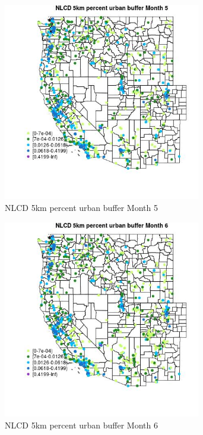 \begin{figure} 
\centering  
\includegraphics[width=0.77\textwidth]{Code_Outputs/Report_ML_input_PM25_Step4_part_e_de_duplicated_aves_compiled_2019-05-21wNAs_MapObsMo5NLCD_5km_percent_urban_buffer.jpg} 
\caption{\label{fig:Report_ML_input_PM25_Step4_part_e_de_duplicated_aves_compiled_2019-05-21wNAsMapObsMo5NLCD_5km_percent_urban_buffer}NLCD 5km percent urban buffer Month 5} 
\end{figure} 
 

\begin{figure} 
\centering  
\includegraphics[width=0.77\textwidth]{Code_Outputs/Report_ML_input_PM25_Step4_part_e_de_duplicated_aves_compiled_2019-05-21wNAs_MapObsMo6NLCD_5km_percent_urban_buffer.jpg} 
\caption{\label{fig:Report_ML_input_PM25_Step4_part_e_de_duplicated_aves_compiled_2019-05-21wNAsMapObsMo6NLCD_5km_percent_urban_buffer}NLCD 5km percent urban buffer Month 6} 
\end{figure} 
 

